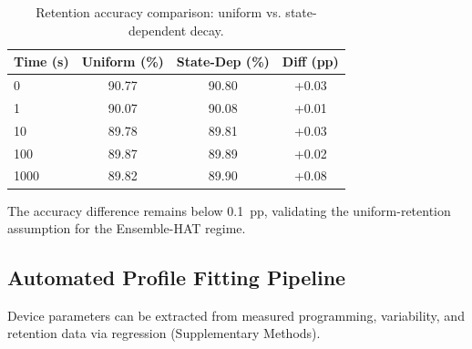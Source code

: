 \begin{table}[ht]
\centering
\caption{Retention accuracy comparison: uniform vs. state-dependent decay.}
\label{tab:retention-comparison}
\begin{tabular}{lccc}
\toprule
\textbf{Time (s)} & \textbf{Uniform (\%)} & \textbf{State-Dep (\%)} & \textbf{Diff (pp)} \\
\midrule
0    & 90.77 & 90.80 & +0.03 \\
1    & 90.07 & 90.08 & +0.01 \\
10   & 89.78 & 89.81 & +0.03 \\
100  & 89.87 & 89.89 & +0.02 \\
1000 & 89.82 & 89.90 & +0.08 \\
\bottomrule
\end{tabular}
\end{table}

The accuracy difference remains below 0.1~pp, validating the uniform-retention assumption for the Ensemble-HAT regime.

\FloatBarrier

\subsection{Automated Profile Fitting Pipeline}
\label{subsec:auto-fitting}

Device parameters can be extracted from measured programming, variability, and retention data via regression (Supplementary Methods).
